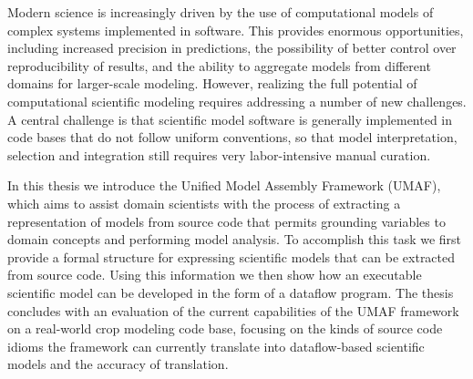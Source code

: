 Modern science is increasingly driven by the use of computational models of complex systems implemented in software.
This provides enormous opportunities, including increased precision in predictions, the possibility of better control over reproducibility of results, and the ability to aggregate models from different domains for larger-scale modeling.
However, realizing the full potential of computational scientific modeling requires addressing a number of new challenges.
A central challenge is that scientific model software is generally implemented in code bases that do not follow uniform conventions, so that model interpretation, selection and integration still requires very labor-intensive manual curation.

In this thesis we introduce the Unified Model Assembly Framework (UMAF), which aims to assist domain scientists with the process of extracting a representation of models from source code that permits grounding variables to domain concepts and performing model analysis.
To accomplish this task we first provide a formal structure for expressing scientific models that can be extracted from source code.
Using this information we then show how an executable scientific model can be developed in the form of a dataflow program.
The thesis concludes with an evaluation of the current capabilities of the UMAF framework on a real-world crop modeling code base, focusing on the kinds of source code idioms the framework can currently translate into dataflow-based scientific models and the accuracy of translation.
